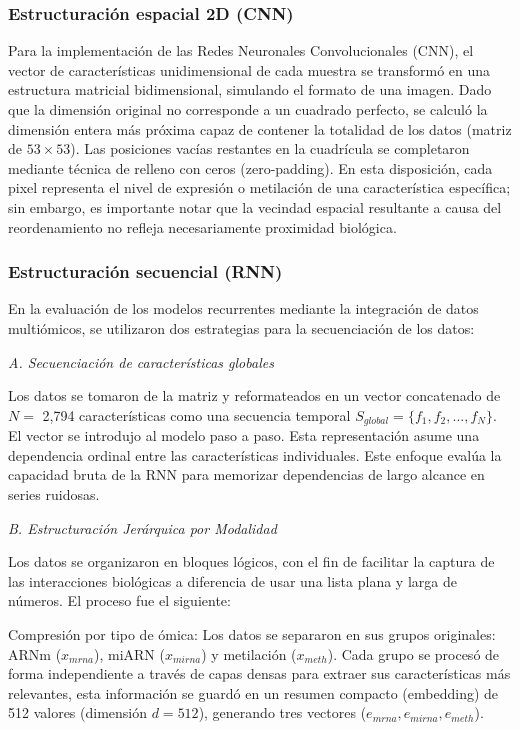 \documentclass[preprint,number]{elsarticle}
\begin{document}
\subsubsection{Estructuración espacial 2D (CNN)}

Para la implementación de las Redes Neuronales Convolucionales (CNN), el vector de características unidimensional de cada muestra se transformó en una estructura matricial bidimensional, simulando el formato de una imagen. Dado que la dimensión original no corresponde a un cuadrado perfecto, se calculó la dimensión entera más próxima capaz de contener la totalidad de los datos (matriz de $53 \times 53$). Las posiciones vacías restantes en la cuadrícula se completaron mediante técnica de relleno con ceros (zero-padding). En esta disposición, cada pixel representa el nivel de expresión o metilación de una característica específica; sin embargo, es importante notar que la vecindad espacial resultante a causa del reordenamiento no refleja necesariamente proximidad biológica.


\subsubsection{Estructuración secuencial (RNN)}

En la evaluación de los modelos recurrentes mediante la integración de datos multiómicos, se utilizaron dos estrategias para la secuenciación de los datos:

\textit{A. Secuenciación de características globales}

Los datos se tomaron de la matriz y reformateados en un vector concatenado de $N =$ 2,794 características como una secuencia temporal $S_{global} = \{f_1, f_2, ..., f_N\}$. El vector se introdujo al modelo paso a paso. Esta representación asume una dependencia ordinal entre las características individuales. Este enfoque evalúa la capacidad bruta de la RNN para memorizar dependencias de largo alcance en series ruidosas.

\textit{B. Estructuración Jerárquica por Modalidad}

Los datos se organizaron en bloques lógicos, con el fin de facilitar la captura de las interacciones biológicas a diferencia de usar una lista plana y larga de números. El proceso fue el siguiente:

Compresión por tipo de ómica: Los datos se separaron en sus grupos originales: ARNm ($x_{mrna}$), miARN ($x_{mirna}$) y metilación ($x_{meth}$). Cada grupo se procesó de forma independiente a través de capas densas para extraer sus características más relevantes, esta información se guardó en un resumen compacto (embedding) de 512 valores (dimensión $d=512$), generando tres vectores ($e_{mrna}, e_{mirna}, e_{meth}$).
\end{document}
